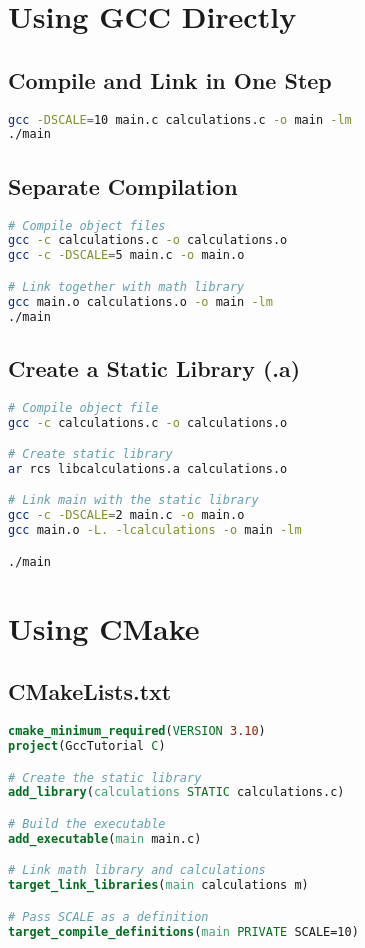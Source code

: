 \documentclass[11pt,a4paper]{article}
\begin{document}
\section{Using GCC Directly}

\subsection{Compile and Link in One Step}
\begin{lstlisting}[language=bash]
gcc -DSCALE=10 main.c calculations.c -o main -lm
./main
\end{lstlisting}

\subsection{Separate Compilation}
\begin{lstlisting}[language=bash]
# Compile object files
gcc -c calculations.c -o calculations.o
gcc -c -DSCALE=5 main.c -o main.o

# Link together with math library
gcc main.o calculations.o -o main -lm
./main
\end{lstlisting}

\subsection{Create a Static Library (.a)}
\begin{lstlisting}[language=bash]
# Compile object file
gcc -c calculations.c -o calculations.o

# Create static library
ar rcs libcalculations.a calculations.o

# Link main with the static library
gcc -c -DSCALE=2 main.c -o main.o
gcc main.o -L. -lcalculations -o main -lm

./main
\end{lstlisting}

\section{Using CMake}

\subsection{CMakeLists.txt}
\begin{lstlisting}[language=cmake]
cmake_minimum_required(VERSION 3.10)
project(GccTutorial C)

# Create the static library
add_library(calculations STATIC calculations.c)

# Build the executable
add_executable(main main.c)

# Link math library and calculations
target_link_libraries(main calculations m)

# Pass SCALE as a definition
target_compile_definitions(main PRIVATE SCALE=10)
\end{lstlisting}
\end{document}
